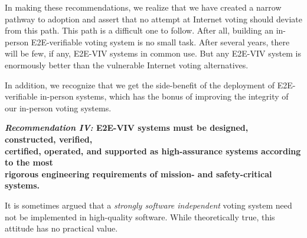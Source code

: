 In making these recommendations, we realize that we have created a
narrow pathway to adoption and assert that no attempt at Internet
voting should deviate from this path.  This path is a difficult one to
follow.  After all, building an in-person E2E-verifiable voting system
is no small task.  After several years, there will be few, if any,
E2E-VIV systems in common use.  But any E2E-VIV system is enormously
better than the vulnerable Internet voting alternatives.  

In addition, we recognize that we get the side-benefit of the
deployment of E2E-verifiable in-person systems, which has the bonus of
improving the integrity of our in-person voting systems.

\begin{center}
  \textbf{\emph{Recommendation IV:} E2E-VIV systems must be designed,
    constructed, verified,\\
    certified, operated, and supported as high-assurance systems
    according to the most\\
    rigorous engineering requirements of mission- and safety-critical
    systems.}
\end{center}

It is sometimes argued that a \emph{strongly software independent}
voting system need not be implemented in high-quality software. While
theoretically true, this attitude has no practical value.

